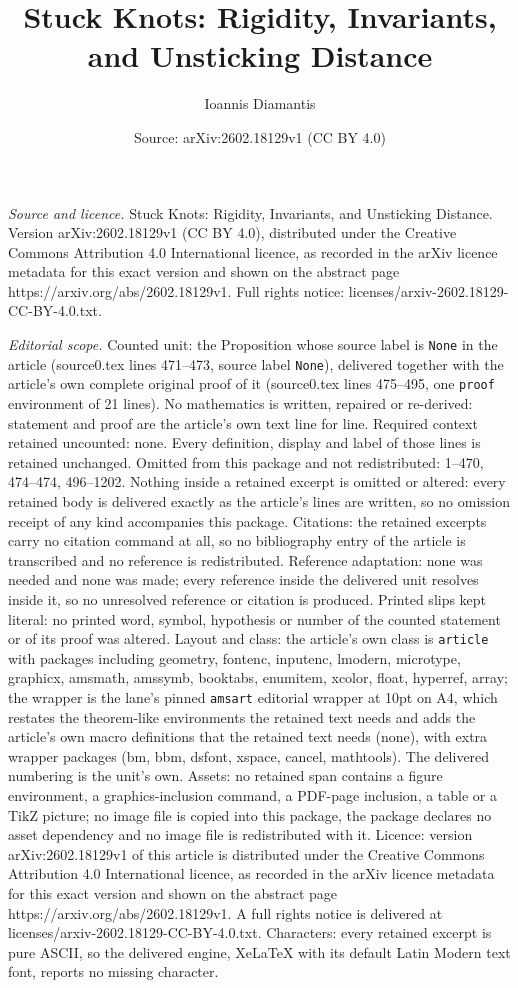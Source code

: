 \documentclass[10pt,a4paper]{amsart}
\title[Stuck Knots: Rigidity, Invariants, and Unsticking Distance]{Stuck Knots: Rigidity, Invariants, and Unsticking Distance}
\author{Ioannis Diamantis}
\date{Source: arXiv:2602.18129v1 (CC BY 4.0)}
\begin{document}
\maketitle

\noindent\emph{Source and licence.} Stuck Knots: Rigidity, Invariants, and Unsticking Distance. Version arXiv:2602.18129v1 (CC BY 4.0), distributed under the Creative Commons Attribution 4.0 International licence, as recorded in the arXiv licence metadata for this exact version and shown on the abstract page https://arxiv.org/abs/2602.18129v1. Full rights notice: licenses/arxiv-2602.18129-CC-BY-4.0.txt.\par\smallskip

\noindent\textit{Editorial scope.} Counted unit: the Proposition whose source label is \texttt{None} in the article (source0.tex lines 471--473, source label \texttt{None}), delivered together with the article's own complete original proof of it (source0.tex lines 475--495, one \texttt{proof} environment of 21 lines). No mathematics is written, repaired or re-derived: statement and proof are the article's own text line for line. Required context retained uncounted: none. Every definition, display and label of those lines is retained unchanged. Omitted from this package and not redistributed: 1--470, 474--474, 496--1202. Nothing inside a retained excerpt is omitted or altered: every retained body is delivered exactly as the article's lines are written, so no omission receipt of any kind accompanies this package. Citations: the retained excerpts carry no citation command at all, so no bibliography entry of the article is transcribed and no reference is redistributed. Reference adaptation: none was needed and none was made; every reference inside the delivered unit resolves inside it, so no unresolved reference or citation is produced. Printed slips kept literal: no printed word, symbol, hypothesis or number of the counted statement or of its proof was altered. Layout and class: the article's own class is \texttt{article} with packages including geometry, fontenc, inputenc, lmodern, microtype, graphicx, amsmath, amssymb, booktabs, enumitem, xcolor, float, hyperref, array; the wrapper is the lane's pinned \texttt{amsart} editorial wrapper at 10pt on A4, which restates the theorem-like environments the retained text needs and adds the article's own macro definitions that the retained text needs (none), with extra wrapper packages (bm, bbm, dsfont, xspace, cancel, mathtools). The delivered numbering is the unit's own. Assets: no retained span contains a figure environment, a graphics-inclusion command, a PDF-page inclusion, a table or a TikZ picture; no image file is copied into this package, the package declares no asset dependency and no image file is redistributed with it. Licence: version arXiv:2602.18129v1 of this article is distributed under the Creative Commons Attribution 4.0 International licence, as recorded in the arXiv licence metadata for this exact version and shown on the abstract page https://arxiv.org/abs/2602.18129v1. A full rights notice is delivered at licenses/arxiv-2602.18129-CC-BY-4.0.txt. Characters: every retained excerpt is pure ASCII, so the delivered engine, XeLaTeX with its default Latin Modern text font, reports no missing character.
\end{document}
